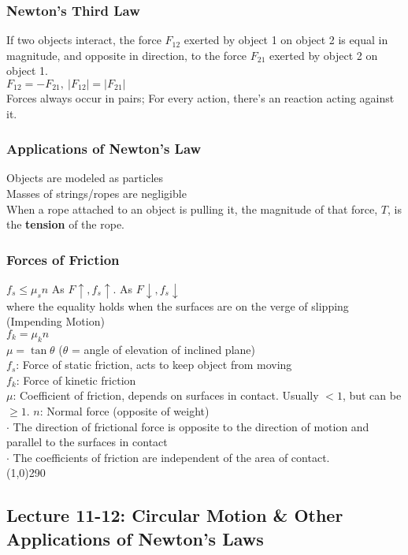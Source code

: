 \documentclass[10 pt]{article}
\begin{document}
\begin{multicols}{2}
\subsubsection*{Newton's Third Law}
\noindent If two objects interact, the force $F_{12}$ exerted by object 1 on object 2 is equal in magnitude, and opposite in direction, to the force $F_{21}$ exerted by object 2 on object 1.\\
\indent $F_{12} = -F_{21},~|F_{12}| = |F_{21}|$\\
Forces always occur in pairs; For every action, there's an reaction acting against it.
\subsubsection*{Applications of Newton's Law}
\noindent Objects are modeled as particles\\
\noindent Masses of strings/ropes are negligible\\
\noindent When a rope attached to an object is pulling it, the magnitude of that force, $T$, is the \textbf{tension} of the rope.
\subsubsection*{Forces of Friction}
$f_s \leq \mu_s n$ \indent As $F \uparrow, f_s \uparrow$. As $F \downarrow, f_s \downarrow$\\
\indent \indent where the equality holds when the surfaces are on the verge of slipping (Impending Motion)\\
\indent$f_k = \mu_k n$\\
\indent$\mu = \tan \theta$ ($\theta$ = angle of elevation of inclined plane)\\
$f_s$: Force of static friction, acts to keep object from moving\\
$f_k$: Force of kinetic friction\\
$\mu$: Coefficient of friction, depends on surfaces in contact. Usually $< 1$, but can be $\geq 1$.
$n$: Normal force (opposite of weight)\\
$\cdot$ The direction of frictional force is opposite to the direction of motion and parallel to the surfaces in contact\\
$\cdot$ The coefficients of friction are independent of the area of contact.\\
\line(1,0){290}
\subsection*{Lecture 11-12: Circular Motion \& Other Applications of Newton's Laws}

\end{multicols}
\end{document}
